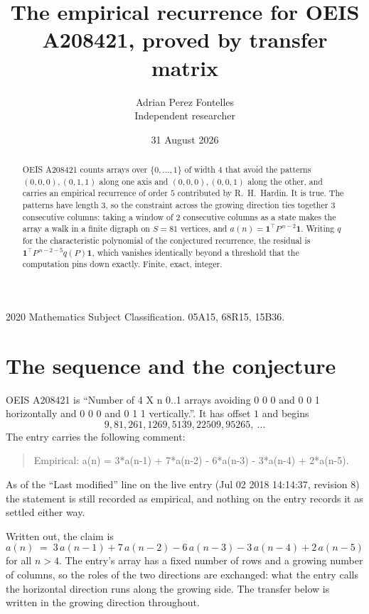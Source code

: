 \documentclass[11pt,a4paper]{article}
\title{The empirical recurrence for OEIS A208421, proved by transfer matrix}
\author{Adrian Perez Fontelles\\ \small Independent researcher}
\date{31 August 2026}
\theoremstyle{plain}
\theoremstyle{definition}
\begin{document}
\maketitle

\begin{abstract}
OEIS A208421 counts arrays over $\{0,\dots,1\}$ of width $4$ that avoid the patterns
$(0,0,0), (0,1,1)$ along one axis and $(0,0,0), (0,0,1)$ along the other, and carries an empirical recurrence of
order $5$ contributed by R.~H.~Hardin. It is true. The patterns have length $3$, so
the constraint across the growing direction ties together $3$ consecutive columns: taking a
window of $2$ consecutive columns as a state makes the array a walk in a finite digraph
on $S=81$ vertices, and $a(n)=\mathbf{1}^{\!\top}P^{\,n-2}\mathbf{1}$. Writing $q$
for the characteristic polynomial of the conjectured recurrence, the residual is
$\mathbf{1}^{\!\top}P^{\,n-2-5}q(P)\mathbf{1}$, which vanishes identically
beyond a threshold that the computation pins down exactly. Finite, exact, integer.
\end{abstract}

\noindent\small 2020 Mathematics Subject Classification. 05A15, 68R15, 15B36.\normalsize

\section{The sequence and the conjecture}

OEIS A208421 is ``Number of 4 X n 0..1 arrays avoiding 0 0 0 and 0 0 1 horizontally and 0 0 0 and 0 1 1 vertically.''. It has offset
$1$ and begins
\[
9, 81, 261, 1269, 5139, 22509, 95265,\ \dots
\]
The entry carries the following comment:
\begin{quote}\small
Empirical: a(n) = 3*a(n-1) + 7*a(n-2) - 6*a(n-3) - 3*a(n-4) + 2*a(n-5).
\end{quote}
As of the ``Last modified'' line on the live entry (Jul 02 2018 14:14:37, revision
8) the statement is still recorded as empirical, and nothing on the entry
records it as settled either way.

Written out, the claim is
\begin{equation}\label{eq:conj}
a(n)\;=\;3\,a(n-1) + 7\,a(n-2) - 6\,a(n-3) - 3\,a(n-4) + 2\,a(n-5)
\end{equation}
for all $n>4$. The entry's array has a fixed number of rows and a growing number of
columns, so the roles of the two directions are exchanged: what the entry calls the
horizontal direction runs along the growing side. The transfer below is written in the
growing direction throughout.
\end{document}
